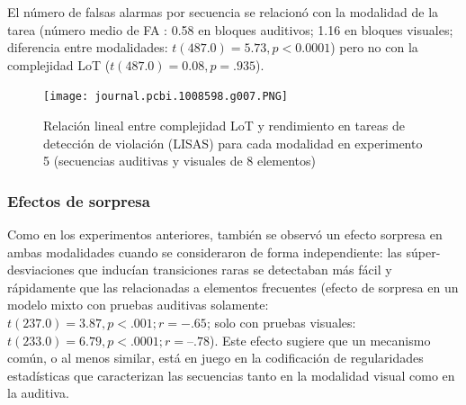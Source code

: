 El número de falsas alarmas por secuencia se relacionó con la modalidad de la tarea (número medio de FA : 0.58 en bloques auditivos; 1.16 en bloques visuales; diferencia entre modalidades: $t (487.0) = 5.73, p <0.0001$) pero no con la complejidad LoT ($t(487.0) = 0.08, p = .935$).

\begin{figure}[t!]
   \texttt{[image: journal.pcbi.1008598.g007.PNG]}
   \centering
   \caption{Relación lineal entre complejidad LoT y rendimiento en tareas de detección de violación (LISAS) para cada modalidad en experimento 5 (secuencias auditivas y visuales de 8 elementos)}
   \label{PlosBIO-F7}
\end{figure}

\subsubsection*{Efectos de sorpresa}


Como en los experimentos anteriores, también se observó un efecto sorpresa en ambas modalidades cuando se consideraron de forma independiente: las súper-desviaciones que inducían transiciones raras se detectaban más fácil y rápidamente que las relacionadas a elementos frecuentes (efecto de sorpresa en un modelo mixto con pruebas auditivas solamente: $t(237.0) = 3.87, p < .001; r =-.65$; solo con pruebas visuales: $t (233.0) = 6.79, p < .0001; r = –.78$). Este efecto sugiere que un mecanismo común, o al menos similar, está en juego en la codificación de regularidades estadísticas que caracterizan las secuencias tanto en la modalidad visual como en la auditiva.


